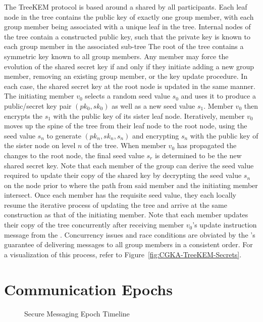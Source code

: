 The TreeKEM protocol is based around a  \autocite{baerentzen2003left} shared by all participants.
Each leaf node in the tree contains the public key \autocite{rfc4949} of exactly one group member, with each group member being associated with a unique leaf in the tree.
Internal nodes of the tree contain a constructed public key, such that the private key is known to each group member in the associated sub-tree
The root of the tree contains a symmetric key \autocite{rfc4949} known to all group members.
Any member may force the evolution of the shared secret key if and only if they initiate adding a new group member, removing an existing group member, or the key update procedure.
In each case, the shared secret key at the root node is updated in the same manner.
The initiating member $v_{0}$ selects a random seed \autocite{rfc4949} value \(s_0\) and uses it to produce a public/secret key pair \((pk_0,sk_0)\) as well as a new seed value \(s_1\).
Member $v_{0}$ then encrypts the \(s_1\) with the public key of its sister leaf node.
Iteratively, member $v_{0}$ moves up the spine of the tree from their leaf node to the root node, using the seed value \(s_n\) to generate \((pk_n,sk_n,s_n)\) and encrypting \(s_n\) with the public key of the sister node on level \(n\) of the tree.
When member $v_{0}$ has propagated the changes to the root node, the final seed value \(s_r\) is determined to be the new shared secret key.
Note that each member of the group can derive the seed value required to update their copy of the shared key by decrypting the seed value \(s_n\) on the node prior to where the path from said member and the initiating member intersect.
Once each member has the requisite seed value, they each locally resume the iterative process of updating the tree and arrive at the same construction as that of the initiating member.
Note that each member updates their copy of the tree concurrently after receiving member $v_{0}$'s update instruction message from the .
Concurrency issues and race conditions are obviated by the 's guarantee of delivering messages to all group members in a consistent order.
For a visualization of this process, refer to Figure\ \ref{fig:CGKA-TreeKEM-Secrets}.


\hypertarget{sec:communication-epochs}{%
\section{Communication Epochs}\label{sec:communication-epochs}}

\begin{figure}[ht!]
  \centering
  \caption[Secure Messaging Epoch Timeline]{%
  \label{fig:Secure-Messaging-Timeline}%
  Secure Messaging Epoch Timeline
  }%
\end{figure}

